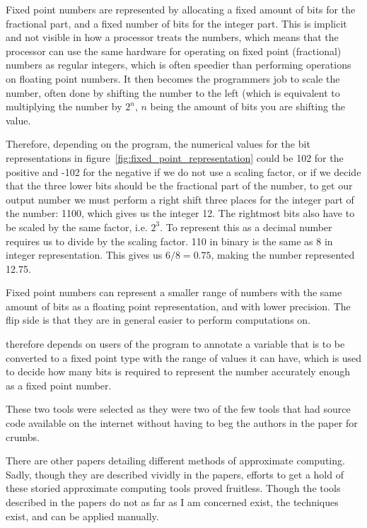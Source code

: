 Fixed point numbers are represented by allocating a fixed amount of bits for the fractional part, and a fixed number of bits for the integer part. This is implicit and not visible in how a processor treats the numbers, which means that the processor can use the same hardware for operating on fixed point (fractional) numbers as regular integers, which is often speedier than performing operations on floating point numbers. It then becomes the programmers job to scale the number, often done by shifting the number to the left (which is equivalent to multiplying the number by $2^n$, $n$ being the amount of bits you are shifting the value.

Therefore, depending on the program, the numerical values for the bit representations in figure~\ref{fig:fixed_point_representation} could be 102 for the positive and -102 for the negative if we do not use a scaling factor, or if we decide that the three lower bits should be the fractional part of the number, to get our output number we must perform a right shift three places for the integer part of the number: 1100, which gives us the integer 12. The rightmost bits also have to be scaled by the same factor, i.e. $2^3$. To represent this as a decimal number requires us to divide by the scaling factor. 110 in binary is the same as 8 in integer representation. This gives us $6/8 = 0.75$, making the number represented 12.75.

Fixed point numbers can represent a smaller range of numbers with the same amount of bits as a floating point representation, and with lower precision. The flip side is that they are in general easier to perform computations on. 

\taffo{} therefore depends on users of the program to annotate a variable that is to be converted to a fixed point type with the range of values it can have, which is used to decide how many bits is required to represent the number accurately enough as a fixed point number. 

These two tools were selected as they were two of the few tools that had source code available on the internet without having to beg the authors in the paper for crumbs. 

There are other papers detailing different methods of approximate computing. Sadly, though they are described vividly in the papers, efforts to get a hold of these storied approximate computing tools proved fruitless. Though the tools described in the papers do not as far as I am concerned exist, the techniques exist, and can be applied manually.

